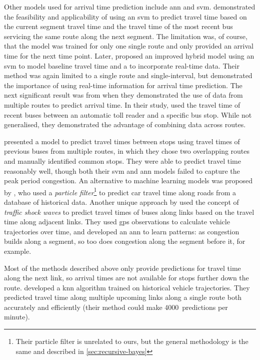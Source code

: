 Other models used for arrival time prediction include \gls{ann} and \gls{svm}.  demonstrated the feasibility and applicability of using an \gls{svm} to predict travel time based on the current segment travel time and the travel time of the most recent bus servicing the same route along the next segment. The limitation was, of course, that the model was trained for only one single route and only provided an arrival time for the next time point. Later, \citet{Yu_2010} proposed an improved hybrid model using an \gls{svm} to model baseline travel time and a \kf{} to incorporate real-time data. Their method was again limited to a single route and single-interval, but demonstrated the importance of using real-time information for arrival time prediction. The next significant result was from \citet{Yu_2011} when they demonstrated the use of data from multiple routes to predict arrival time. In their study, \citeauthor{Yu_2011} used the travel time of recent buses between an automatic toll reader and a specific bus stop. While not generalised, they demonstrated the advantage of combining data across routes.


 presented a model to predict travel times between stops using travel times of previous buses from multiple routes, in which they chose two overlapping routes and manually identified common stops. They were able to predict travel time reasonably well, though both their \gls{svm} and \gls{ann} models failed to capture the peak period congestion. An alternative to machine learning models was proposed by \citet{Chen_2014}, who used a \emph{particle filter}\footnote{Their particle filter is unrelated to ours, but the general methodology is the same and described in \cref{sec:recursive-bayes}} to predict car travel time along roads from a database of historical data. Another unique approach by \citet{Julio_2016} used the concept of \emph{traffic shock waves} to predict travel times of buses along links based on the travel time along adjacent links. They used \gls{gps} observations to calculate vehicle trajectories over time, and developed an \gls{ann} to learn patterns: as congestion builds along a segment, so too does congestion along the segment before it, for example.


Most of the methods described above only provide predictions for travel time along the next link, so arrival times are not available for stops further down the route.  developed a \gls{knn} algorithm trained on historical vehicle trajectories. They predicted travel time along multiple upcoming links along a single route both accurately and efficiently (their method could make 4000~predictions per minute).


